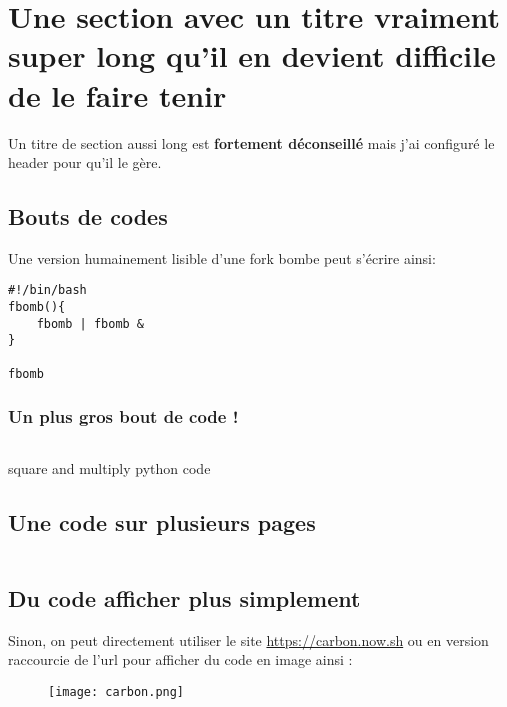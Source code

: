 \section{Une section avec un titre vraiment super long qu'il en devient difficile de le faire tenir}
Un titre de section aussi long est \textbf{fortement déconseillé} mais j'ai configuré le header pour qu'il le gère.

\subsection{Bouts de codes}
Une version humainement lisible d'une fork bombe peut s'écrire ainsi:
\begin{verbatim}
#!/bin/bash
fbomb(){
    fbomb | fbomb &
}

fbomb
\end{verbatim}

\subsubsection{Un plus gros bout de code !}
\begin{listing}[H]
    \inputminted{python}{src/parts/code/example.py}
    \caption{square and multiply python code}
    \label{cd:square_and_mult}
\end{listing}

\subsection{Une code sur plusieurs pages}

\inputminted{python}{src/parts/code/example2.py}


\subsection{Du code afficher plus simplement}

Sinon, on peut directement utiliser le site \url{https://carbon.now.sh} ou en version raccourcie de l'url  pour afficher du code en image ainsi :
\begin{figure}[H]
    \centering
    \texttt{[image: carbon.png]}
\end{figure}

